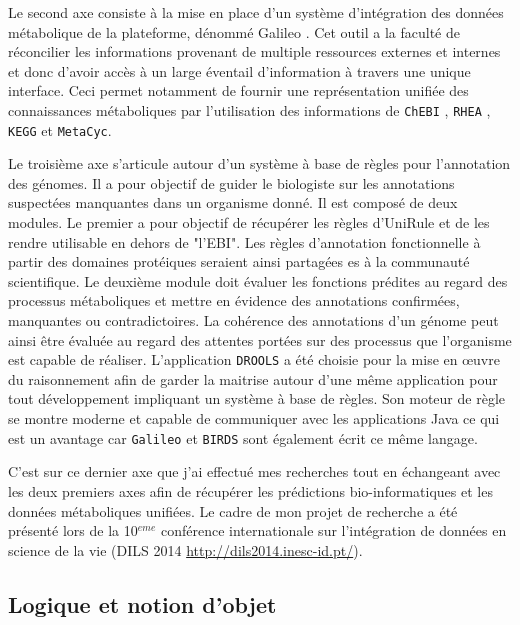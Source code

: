 \begin{refsegment}
Le second axe consiste à la mise en place d'un système d'intégration des données métabolique de la plateforme, dénommé Galileo \cite{galileo2014}. Cet outil a la faculté de réconcilier les informations provenant de multiple ressources externes et internes et donc d'avoir accès à un large éventail d'information à travers une unique interface. Ceci permet  notamment de fournir une représentation unifiée des connaissances métaboliques par l'utilisation des informations de \texttt{ChEBI} \cite{hastings2013chebi}, \texttt{RHEA} \cite{alcantara2012rhea}, \texttt{KEGG} et \texttt{MetaCyc}.

Le troisième axe s'articule autour d'un système à base de règles pour l'annotation des génomes. Il a pour objectif de guider le biologiste sur les annotations suspectées manquantes dans un organisme donné. Il est composé de deux modules. Le premier a pour objectif de récupérer les règles d'UniRule et de les rendre utilisable en dehors de "l'\gls{EBI}". Les règles d'annotation fonctionnelle à partir des domaines protéiques seraient ainsi partagées es à la communauté scientifique. Le deuxième module doit évaluer les fonctions prédites au regard des processus métaboliques et mettre en évidence des annotations confirmées,   manquantes ou contradictoires. La cohérence des annotations d'un génome peut ainsi être évaluée au regard des attentes portées sur des processus que l'organisme est capable de réaliser. L'application \texttt{DROOLS} a été choisie pour la mise en œuvre du raisonnement afin de garder la maitrise autour d'une même application pour tout développement impliquant un système à base de règles. Son moteur de règle se montre moderne et capable de communiquer avec les applications Java ce  qui est un avantage car \texttt{Galileo} et \texttt{BIRDS} sont également écrit ce même langage.

C'est sur ce dernier axe que j'ai effectué mes recherches tout en échangeant avec les deux premiers axes afin de récupérer les prédictions bio-informatiques et les données métaboliques unifiées. Le cadre de mon projet de recherche a été présenté lors de la 10$^{eme}$ conférence internationale sur l'intégration de données en science de la vie (DILS 2014 \url{http://dils2014.inesc-id.pt/}).



\subsection{Logique et notion d'objet}


\end{refsegment}
